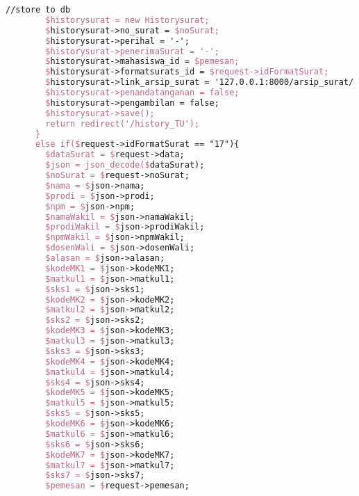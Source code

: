 \begin{lstlisting}[language=tex,basicstyle=\tiny,caption=HistorysuratController.php]
        //store to db
        $historysurat = new Historysurat;
        $historysurat->no_surat = $noSurat;
        $historysurat->perihal = '-';
        $historysurat->penerimaSurat = '-';
        $historysurat->mahasiswa_id = $pemesan;
        $historysurat->formatsurats_id = $request->idFormatSurat;
        $historysurat->link_arsip_surat = '127.0.0.1:8000/arsip_surat/' . $noSurat. '_' . $npm . '_surat_perwakilan_perwalian_6mk.pdf';
        $historysurat->penandatanganan = false;
        $historysurat->pengambilan = false;
        $historysurat->save();
        return redirect('/history_TU');
      }
      else if($request->idFormatSurat == "17"){
        $dataSurat = $request->data;
        $json = json_decode($dataSurat);
        $noSurat = $request->noSurat;
        $nama = $json->nama;
        $prodi = $json->prodi;
        $npm = $json->npm;
        $namaWakil = $json->namaWakil;
        $prodiWakil = $json->prodiWakil;
        $npmWakil = $json->npmWakil;
        $dosenWali = $json->dosenWali;
        $alasan = $json->alasan;
        $kodeMK1 = $json->kodeMK1;
        $matkul1 = $json->matkul1;
        $sks1 = $json->sks1;
        $kodeMK2 = $json->kodeMK2;
        $matkul2 = $json->matkul2;
        $sks2 = $json->sks2;
        $kodeMK3 = $json->kodeMK3;
        $matkul3 = $json->matkul3;
        $sks3 = $json->sks3;
        $kodeMK4 = $json->kodeMK4;
        $matkul4 = $json->matkul4;
        $sks4 = $json->sks4;
        $kodeMK5 = $json->kodeMK5;
        $matkul5 = $json->matkul5;
        $sks5 = $json->sks5;
        $kodeMK6 = $json->kodeMK6;
        $matkul6 = $json->matkul6;
        $sks6 = $json->sks6;
        $kodeMK7 = $json->kodeMK7;
        $matkul7 = $json->matkul7;
        $sks7 = $json->sks7;
        $pemesan = $request->pemesan;


\end{lstlisting}
